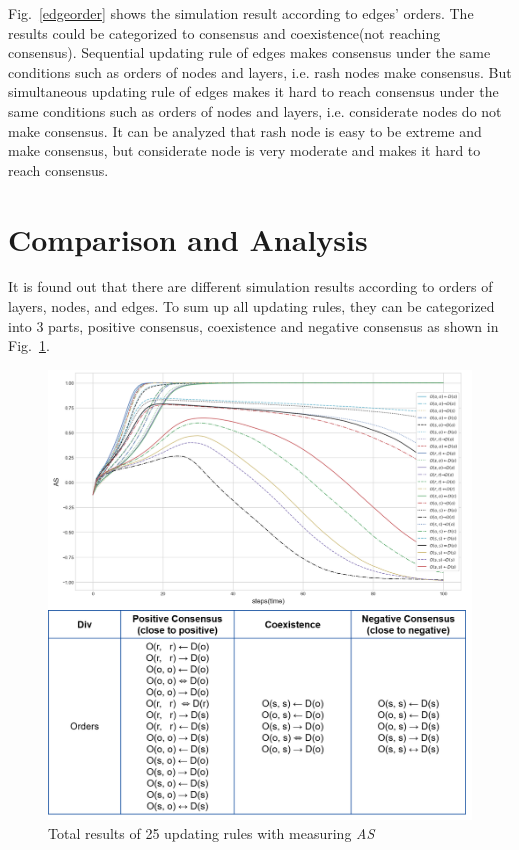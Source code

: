 Fig.~\ref{edgeorder} shows the simulation result according to edges' orders. The results could be categorized to consensus and coexistence(not reaching consensus). Sequential updating rule of edges makes consensus under the same conditions such as orders of nodes and layers, i.e. rash nodes make consensus. But simultaneous updating rule of edges makes it hard to reach consensus under the same conditions such as orders of nodes and layers, i.e. considerate nodes do not make consensus. It can be analyzed that rash node is easy to be extreme and make consensus, but considerate node is very moderate and makes it hard to reach consensus.\\
 
\section{Comparison and Analysis}
It is found out that there are different simulation results according to orders of layers, nodes, and edges. To sum up all updating rules, they can be categorized into 3 parts, positive consensus, coexistence and negative consensus as shown in Fig.~\ref{ordertotal}.  
\begin{figure}[!htb]
	\centering
	\includegraphics[width=\hsize]{figure/chap4_ordertotal.png}
	\caption{Total results of 25 updating rules with measuring \textit{AS}}
	\label{ordertotal}
\end{figure}

